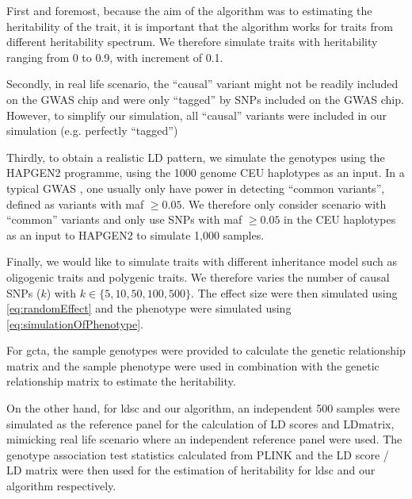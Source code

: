 			First and foremost, because the aim of the algorithm was to estimating the heritability of the trait, it is important that the algorithm works for traits from different heritability spectrum.
			We therefore simulate traits with heritability ranging from 0 to 0.9, with increment of 0.1.
		
			Secondly, in real life scenario, the ``causal'' variant might not be readily included on the \gls{GWAS} chip and were only ``tagged'' by \glspl{SNP} included on the \gls{GWAS} chip.
			However, to simplify our simulation, all ``causal'' variants were included in our simulation (e.g. perfectly ``tagged'')
		
			Thirdly, to obtain a realistic \gls{LD} pattern, we simulate the genotypes using the HAPGEN2 programme\citep{Su2011}, using the 1000 genome \gls{CEU} haplotypes as an input.
			In a typical \gls{GWAS} , one usually only have power in detecting ``common variants'', defined as variants with \gls{maf} $\ge 0.05$.
			We therefore only consider scenario with ``common'' variants and only use \glspl{SNP} with \gls{maf} $\ge0.05$ in the \gls{CEU} haplotypes as an input to HAPGEN2 to simulate 1,000 samples.
			
			Finally, we would like to simulate traits with different inheritance model such as oligogenic traits and polygenic traits.
			We therefore varies the number of causal \glspl{SNP} ($k$) with $k\in\{5, 10, 50, 100, 500\}$.
			The effect size were then simulated using \cref{eq:randomEffect} and the phenotype were simulated using \cref{eq:simulationOfPhenotype}.
			
			For \gls{gcta}, the sample genotypes were provided to calculate the genetic relationship matrix and the sample phenotype were used in combination with the genetic relationship matrix to estimate the heritability.
			
			On the other hand, for \gls{ldsc} and our algorithm, an independent 500 samples were simulated as the reference panel for the calculation of \gls{LD} scores and \gls{LD}matrix, mimicking real life scenario where an independent reference panel were used. 
			The genotype association test statistics calculated from PLINK and the \gls{LD} score / \gls{LD} matrix were then used for the estimation of heritability for \gls{ldsc} and our algorithm respectively. 
			

